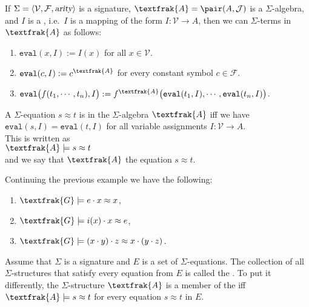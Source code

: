 \begin{Definition}
  If $\Sigma = \langle \mathcal{V}, \mathcal{F}, \textsl{arity} \rangle$ is a signature,
  $\textfrak{A} = \pair(A, \mathcal{J})$ is a $\Sigma$-algebra, and $I$ is a , i.e.~$I$
  is a mapping of the form $I:\mathcal{V} \rightarrow A$,
  then we can  $\Sigma$-terms in $\textfrak{A}$ as follows:
  \begin{enumerate}
  \item $\texttt{eval}(x, I) := I(x)$ \quad for all $x \in \mathcal{V}$.
  \item $\texttt{eval}(c, I) := c^\textfrak{A}$ \quad for every constant symbol $c \in \mathcal{F}$.
  \item $\texttt{eval}\bigl(f(t_1,\cdots,t_n), I\bigr) := f^\textfrak{A}\bigl(\texttt{eval}(t_1,I),\cdots,\texttt{eval}(t_n,I)\bigr)$.
  \end{enumerate}
  A $\Sigma$-equation $s \approx t$ is  in the $\Sigma$-algebra $\textfrak{A}$ iff we have
  \\[0.2cm]
  \hspace*{1.3cm}
  $\texttt{eval}(s,I) = \texttt{eval}(t,I)$ for all variable assignments $I:\mathcal{V} \rightarrow A$.
  \\[0.2cm]
  This is written as
  \\[0.2cm]
  \hspace*{1.3cm}
  $\textfrak{A} \models s \approx t$
  \\[0.2cm]
  and we say that $\textfrak{A}$  the equation $s \approx t$.
  \eoxs
\end{Definition}

\example
Continuing the previous example we have the following:
\begin{enumerate}
\item $\textfrak{G} \models e \cdot x \approx x$,
\item $\textfrak{G} \models i(x) \cdot x \approx e$,
\item $\textfrak{G} \models (x \cdot y) \cdot z \approx x \cdot (y \cdot z)$. \eoxs
\end{enumerate}

\begin{Definition}[$E$-Variety]
  Assume that $\Sigma$ is a signature and $E$ is a set of $\Sigma$-equations.  The collection of all
  $\Sigma$-structures that satisfy every equation from $E$ is called the .
  To put it differently, the $\Sigma$-structure $\textfrak{A}$ is a member of the  iff
  \\[0.2cm]
  \hspace*{1.3cm}
  $\textfrak{A} \models s \approx t$ \quad for every equation $s \approx t$ in $E$. \eoxs
\end{Definition}

